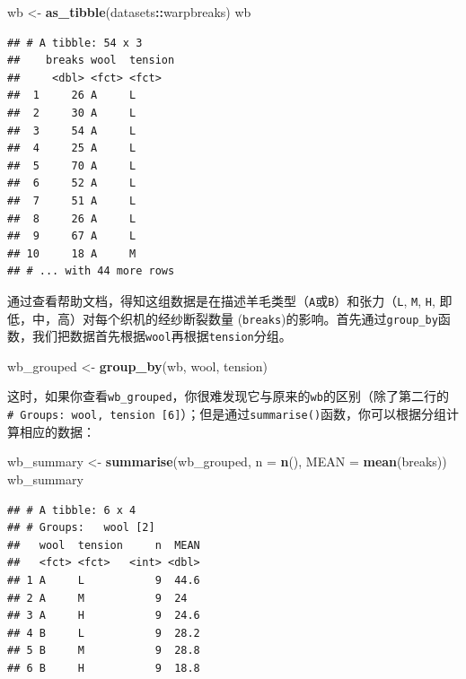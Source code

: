 \documentclass[]{book}
\newenvironment{Shaded}{\begin{snugshade}}{\end{snugshade}}
\newcommand{\DataTypeTok}[1]{\textcolor[rgb]{0.13,0.29,0.53}{#1}}
\newcommand{\KeywordTok}[1]{\textcolor[rgb]{0.13,0.29,0.53}{\textbf{#1}}}
\newcommand{\NormalTok}[1]{#1}
\newcommand{\OperatorTok}[1]{\textcolor[rgb]{0.81,0.36,0.00}{\textbf{#1}}}
\newcommand{\StringTok}[1]{\textcolor[rgb]{0.31,0.60,0.02}{#1}}
\begin{document}
\begin{Shaded}
\begin{Highlighting}[]
\NormalTok{wb <-}\StringTok{ }\KeywordTok{as_tibble}\NormalTok{(datasets}\OperatorTok{::}\NormalTok{warpbreaks)}
\NormalTok{wb}
\end{Highlighting}
\end{Shaded}

\begin{verbatim}
## # A tibble: 54 x 3
##    breaks wool  tension
##     <dbl> <fct> <fct>  
##  1     26 A     L      
##  2     30 A     L      
##  3     54 A     L      
##  4     25 A     L      
##  5     70 A     L      
##  6     52 A     L      
##  7     51 A     L      
##  8     26 A     L      
##  9     67 A     L      
## 10     18 A     M      
## # ... with 44 more rows
\end{verbatim}

通过查看帮助文档，得知这组数据是在描述羊毛类型（\texttt{A}或\texttt{B}）和张力（\texttt{L}, \texttt{M}, \texttt{H}, 即低，中，高）对每个织机的经纱断裂数量 (\texttt{breaks})的影响。首先通过\texttt{group\_by}函数，我们把数据首先根据\texttt{wool}再根据\texttt{tension}分组。

\begin{Shaded}
\begin{Highlighting}[]
\NormalTok{ wb_grouped <-}\StringTok{ }\KeywordTok{group_by}\NormalTok{(wb, wool, tension)}
\end{Highlighting}
\end{Shaded}

这时，如果你查看\texttt{wb\_grouped}，你很难发现它与原来的\texttt{wb}的区别（除了第二行的\texttt{\#\ Groups:\ wool,\ tension\ {[}6{]}}）；但是通过\texttt{summarise()}函数，你可以根据分组计算相应的数据：

\begin{Shaded}
\begin{Highlighting}[]
\NormalTok{wb_summary <-}\StringTok{ }\KeywordTok{summarise}\NormalTok{(wb_grouped, }
          \DataTypeTok{n =} \KeywordTok{n}\NormalTok{(), }
          \DataTypeTok{MEAN =} \KeywordTok{mean}\NormalTok{(breaks))}
\NormalTok{wb_summary}
\end{Highlighting}
\end{Shaded}

\begin{verbatim}
## # A tibble: 6 x 4
## # Groups:   wool [2]
##   wool  tension     n  MEAN
##   <fct> <fct>   <int> <dbl>
## 1 A     L           9  44.6
## 2 A     M           9  24  
## 3 A     H           9  24.6
## 4 B     L           9  28.2
## 5 B     M           9  28.8
## 6 B     H           9  18.8
\end{verbatim}
\end{document}
